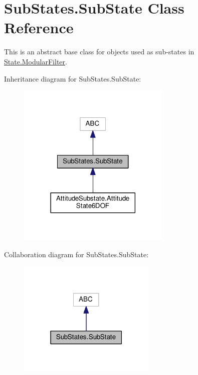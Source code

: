 \hypertarget{classSubStates_1_1SubState}{}\section{Sub\+States.\+Sub\+State Class Reference}
\label{classSubStates_1_1SubState}


This is an abstract base class for objects used as sub-\/states in \hyperlink{classState_1_1ModularFilter}{State.\+Modular\+Filter}.  




Inheritance diagram for Sub\+States.\+Sub\+State\+:\nopagebreak
\begin{figure}[H]
\begin{center}
\leavevmode
\includegraphics[width=206pt]{classSubStates_1_1SubState__inherit__graph}
\end{center}
\end{figure}


Collaboration diagram for Sub\+States.\+Sub\+State\+:\nopagebreak
\begin{figure}[H]
\begin{center}
\leavevmode
\includegraphics[width=186pt]{classSubStates_1_1SubState__coll__graph}
\end{center}
\end{figure}
